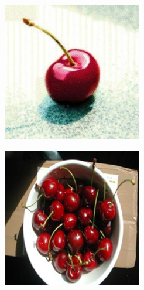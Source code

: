 \documentclass[../main.tex]{subfiles}
\begin{document}
\begin{figure}[h!]
  \centering
  \begin{subfigure}[b]{0.2\linewidth}
    \includegraphics[width=\linewidth]{01-img-variations/single-cherries.png}
  \end{subfigure}
  \begin{subfigure}[b]{0.2\linewidth}
    \includegraphics[width=\linewidth]{01-img-variations/multiple-cherries.png}

\end{subfigure}
\end{figure}
\end{document}
